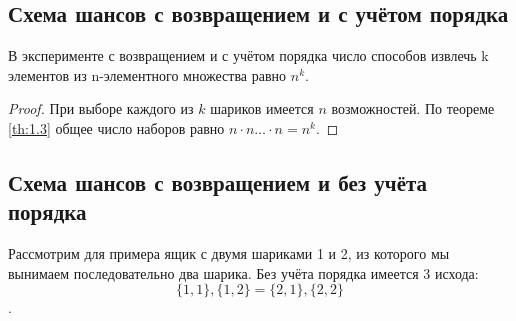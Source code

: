 \subsection{Схема шансов с возвращением и с учётом порядка}
\begin{theorem}
\label{th:1.7}
В эксперименте с возвращением и с учётом порядка число
способов извлечь k элементов из n-элементного множества равно $n^k$.
\end{theorem}
\begin{proof}
При выборе каждого из $k$ шариков имеется $n$ возможностей. 
По теореме \ref{th:1.3} общее число наборов равно $n\cdot n\ldots\cdot n=n^k$.
\end{proof}
\subsection{Схема шансов с возвращением и без учёта порядка}

\begin{zam}
\label{zam:1.8}
Рассмотрим для примера ящик с двумя шариками 1 и 2,
из которого мы вынимаем последовательно два шарика. Без учёта порядка
имеется 3 исхода: 
$$\{1,1\}, \{1,2\} = \{2,1\}, \{2, 2\}$$.
\end{zam}

